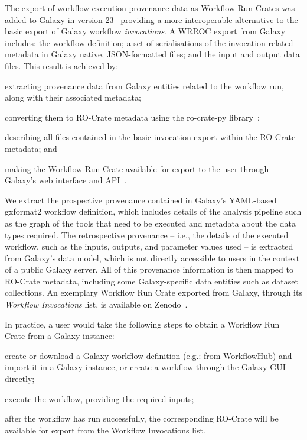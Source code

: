 The export of workflow execution provenance data as Workflow Run Crates was added to Galaxy in version 23~\cite{Galaxy 2023} providing a more interoperable alternative to the basic export of Galaxy workflow
\emph{invocations}. A WRROC export from Galaxy includes: the workflow definition; a set of serialisations of the invocation-related metadata in Galaxy native, JSON-formatted files;
and the input and output data files.
This result is achieved by:
\begin{inlineenum}
\item extracting provenance data from Galaxy entities related to the workflow run, along with their associated metadata;
\item converting them to RO-Crate metadata using the ro-crate-py library~\cite{ro-crate-py};
\item describing all files contained in the basic invocation export within the RO-Crate metadata; and
\item making the Workflow Run Crate available for export to the user through Galaxy's web interface and API~\cite{De Geest 2022b}.
\end{inlineenum}
We extract the prospective provenance contained in Galaxy's YAML-based gxformat2
\cite{gxformat2} workflow definition, which includes details of the analysis pipeline such as the graph of the tools that need to be executed and metadata about the data types required.
The retrospective provenance -- i.e., the details of the executed workflow, such as the inputs, outputs, and parameter values used -- is extracted from Galaxy's data model,
which is not directly accessible to users in the context of a public Galaxy server.
All of this provenance information is then mapped to RO-Crate metadata, including some Galaxy-specific data entities such as dataset collections.
An exemplary Workflow Run Crate exported from Galaxy, through its \emph{Workflow Invocations} list, is available on Zenodo~\cite{De Geest 2023}.

In practice, a user would take the following steps to obtain a Workflow Run Crate from a Galaxy instance:
\begin{inlineenum}
\item create or download a Galaxy workflow definition (e.g.: from WorkflowHub) and import it in a Galaxy instance, or create a workflow through the Galaxy GUI directly;
\item execute the workflow, providing the required inputs;
\item after the workflow has run successfully, the corresponding RO-Crate will be available for export from the Workflow Invocations list.
\end{inlineenum}



